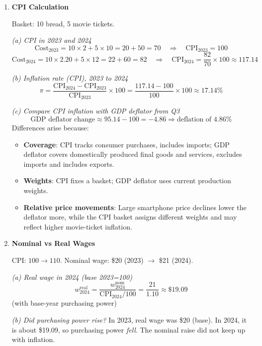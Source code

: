 \documentclass[12pt]{article}
\newcommand{\bn}{\bigskip\noindent}
\begin{document}
\begin{enumerate}[resume]
\item \textbf{CPI Calculation}

Basket: 10 bread, 5 movie tickets.

\bn \textit{(a) CPI in 2023 and 2024}
\[
\text{Cost}_{2023} = 10\times 2 + 5\times 10 = 20 + 50 = 70
\quad\Rightarrow\quad \text{CPI}_{2023} = \boxed{100}
\]
\[
\text{Cost}_{2024} = 10\times 2.20 + 5\times 12 = 22 + 60 = 82
\quad\Rightarrow\quad \text{CPI}_{2024} = \frac{82}{70}\times 100 \approx \boxed{117.14}
\]

\bn \textit{(b) Inflation rate (CPI), 2023 to 2024}
\[
\pi = \frac{\text{CPI}_{2024} - \text{CPI}_{2023}}{\text{CPI}_{2023}}\times 100
= \frac{117.14 - 100}{100}\times 100 \approx \boxed{17.14\%}
\]

\bn \textit{(c) Compare CPI inflation with GDP deflator from Q3}
\[
\text{GDP deflator change} \approx 95.14 - 100 = -4.86 \Rightarrow \text{deflation of } \boxed{4.86\%}
\]
Differences arise because:
\begin{itemize}
    \item \textbf{Coverage}: CPI tracks consumer purchases, includes imports; GDP deflator covers domestically produced final goods and services, excludes imports and includes exports.
    \item \textbf{Weights}: CPI fixes a basket; GDP deflator uses current production weights.
    \item \textbf{Relative price movements}: Large smartphone price declines lower the deflator more, while the CPI basket assigns different weights and may reflect higher movie-ticket inflation.
\end{itemize}

\bigskip

\item \textbf{Nominal vs Real Wages}

CPI: $100 \to 110$. Nominal wage: \$20 (2023) $\to$ \$21 (2024).

\bn \textit{(a) Real wage in 2024 (base 2023=100)}
\[
w^{\text{real}}_{2024} = \frac{w^{\text{nom}}_{2024}}{\text{CPI}_{2024}/100}
= \frac{21}{1.10} \approx \boxed{\$19.09}
\]
(with base-year purchasing power)

\bn \textit{(b) Did purchasing power rise?}
In 2023, real wage was \$20 (base). In 2024, it is about \$19.09, so purchasing power \emph{fell}. The nominal raise did not keep up with inflation.

\end{enumerate}
\end{document}
